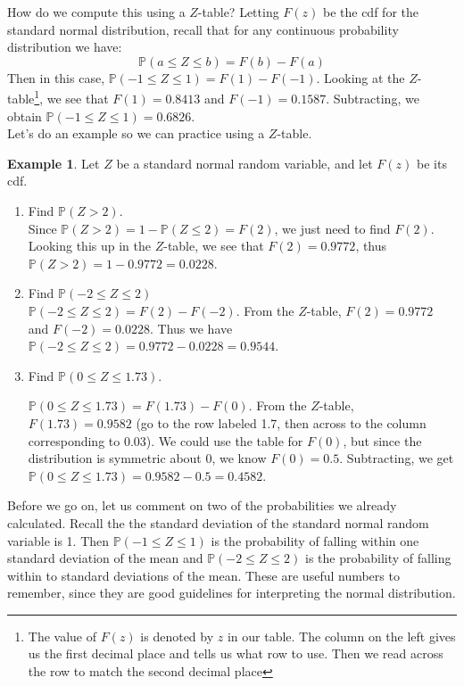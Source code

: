 \documentclass[12pt]{article}
\theoremstyle{definition}
\newtheorem*{example}{Example}
\theoremstyle{remark}
\def\P{{\mathbb P}}
\begin{document}
How do we compute this using a $Z$-table? Letting $F(z)$ be the cdf for the standard normal distribution, recall that for any continuous probability distribution we have:
\[
\P(a \leq Z \leq b) = F(b) - F(a)
\]
Then in this case, $\P(-1 \leq Z \leq 1) = F(1) - F(-1)$. Looking at the $Z$-table\footnote{The value of $F(z)$ is denoted by $z$ in our table. The column on the left gives us the first decimal place and tells us what row to use. Then we read across the row to match the second decimal place}, we see that $F(1) = 0.8413$ and $F(-1) = 0.1587.$ Subtracting, we obtain $\P(-1 \leq Z \leq 1) = 0.6826$.\\

Let's do an example so we can practice using a $Z$-table.

\begin{example}Let $Z$ be a standard normal random variable, and let $F(z)$ be its cdf.
\begin{enumerate}
\item Find $\P(Z > 2)$.\\

Since $\P(Z > 2) = 1 - \P(Z \leq 2) = F(2)$, we just need to find $F(2)$. Looking this up in the $Z$-table, we see that $F(2) = 0.9772$, thus $\P(Z > 2) = 1 - 0.9772 = 0.0228$.

\item Find $\P(-2 \leq Z \leq 2)$\\

$\P(-2 \leq Z \leq 2) = F(2) - F(-2)$. From the $Z$-table, $F(2) = 0.9772$ and $F(-2) = 0.0228$. Thus we have $\P(-2 \leq Z \leq 2) = 0.9772 - 0.0228 = 0.9544$.

\item Find $\P(0 \leq Z \leq 1.73)$.

$\P(0 \leq Z \leq 1.73) = F(1.73) - F(0)$. From the $Z$-table, $F(1.73) = 0.9582$ (go to the row labeled 1.7, then across to the column corresponding to 0.03). We could use the table for $F(0)$, but since the distribution is symmetric about 0, we know $F(0) = 0.5$. Subtracting, we get $\P(0 \leq Z \leq 1.73) = 0.9582 - 0.5 = 0.4582$.

\end{enumerate}
\end{example}

Before we go on, let us comment on two of the probabilities we already calculated. Recall the the standard deviation of the standard normal random variable is 1. Then $\P(-1 \leq Z \leq 1)$ is the probability of falling within one standard deviation of the mean and $\P(-2 \leq Z \leq 2)$ is the probability of falling within to standard deviations of the mean. These are useful numbers to remember, since they are good guidelines for interpreting the normal distribution.
\end{document}
